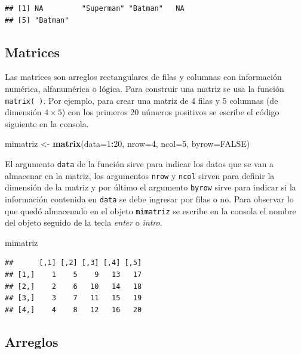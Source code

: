 \documentclass[10pt,]{krantz}
\makeatletter
\newenvironment{Shaded}{\begin{snugshade}}{\end{snugshade}}
\newcommand{\KeywordTok}[1]{\textcolor[rgb]{0.13,0.29,0.53}{\textbf{#1}}}
\newcommand{\DataTypeTok}[1]{\textcolor[rgb]{0.13,0.29,0.53}{#1}}
\newcommand{\DecValTok}[1]{\textcolor[rgb]{0.00,0.00,0.81}{#1}}
\newcommand{\StringTok}[1]{\textcolor[rgb]{0.31,0.60,0.02}{#1}}
\newcommand{\OtherTok}[1]{\textcolor[rgb]{0.56,0.35,0.01}{#1}}
\newcommand{\OperatorTok}[1]{\textcolor[rgb]{0.81,0.36,0.00}{\textbf{#1}}}
\newcommand{\NormalTok}[1]{#1}
\newenvironment{kframe}{%
\medskip{}
\setlength{\fboxsep}{.8em}
 \def\at@end@of@kframe{}%
 \ifinner\ifhmode%
  \def\at@end@of@kframe{\end{minipage}}%
  \begin{minipage}{\columnwidth}%
 \fi\fi%
 \def\FrameCommand##1{\hskip\@totalleftmargin \hskip-\fboxsep
 \colorbox{shadecolor}{##1}\hskip-\fboxsep
     \hskip-\linewidth \hskip-\@totalleftmargin \hskip\columnwidth}%
 \MakeFramed {\advance\hsize-\width
   \@totalleftmargin\z@ \linewidth\hsize
   \@setminipage}}%
 {\par\unskip\endMakeFramed%
 \at@end@of@kframe}
\renewenvironment{Shaded}{\begin{kframe}}{\end{kframe}}
\makeatother
\begin{document}
\begin{verbatim}
## [1] NA         "Superman" "Batman"   NA        
## [5] "Batman"
\end{verbatim}

\subsection{Matrices}

Las matrices  son arreglos rectangulares de filas y
columnas con información numérica, alfanumérica o lógica. Para construir
una matriz se usa la función \texttt{matrix(\ )}. Por ejemplo, para
crear una matriz de 4 filas y 5 columnas (de dimensión \(4 \times 5\))
con los primeros 20 números positivos se escribe el código siguiente en
la consola.

\begin{Shaded}
\begin{Highlighting}[]
\NormalTok{mimatriz <-}\StringTok{ }\KeywordTok{matrix}\NormalTok{(}\DataTypeTok{data=}\DecValTok{1}\OperatorTok{:}\DecValTok{20}\NormalTok{, }\DataTypeTok{nrow=}\DecValTok{4}\NormalTok{, }\DataTypeTok{ncol=}\DecValTok{5}\NormalTok{, }\DataTypeTok{byrow=}\OtherTok{FALSE}\NormalTok{)}
\end{Highlighting}
\end{Shaded}

El argumento \texttt{data} de la función sirve para indicar los datos
que se van a almacenar en la matriz, los argumentos \texttt{nrow} y
\texttt{ncol} sirven para definir la dimensión de la matriz y por último
el argumento \texttt{byrow} sirve para indicar si la información
contenida en \texttt{data} se debe ingresar por filas o no. Para
observar lo que quedó almacenado en el objeto \texttt{mimatriz} se
escribe en la consola el nombre del objeto seguido de la tecla
\textit{enter} o \textit{intro}.

\begin{Shaded}
\begin{Highlighting}[]
\NormalTok{mimatriz}
\end{Highlighting}
\end{Shaded}

\begin{verbatim}
##      [,1] [,2] [,3] [,4] [,5]
## [1,]    1    5    9   13   17
## [2,]    2    6   10   14   18
## [3,]    3    7   11   15   19
## [4,]    4    8   12   16   20
\end{verbatim}

\subsection{Arreglos}
\end{document}
